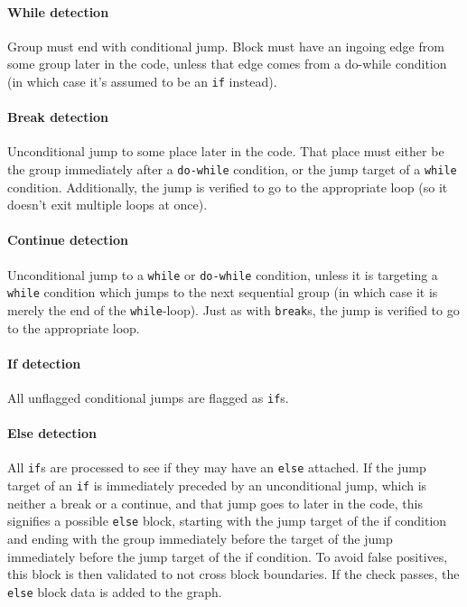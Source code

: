 \paragraph{While detection}
Group must end with conditional jump. Block must have an ingoing edge from some group later in the code, unless that edge comes from a do-while condition (in which case it's assumed to be an \verb+if+ instead).

\paragraph{Break detection}
Unconditional jump to some place later in the code. That place must either be the group immediately after a \verb+do-while+ condition, or the jump target of a \verb+while+ condition. Additionally, the jump is verified to go to the appropriate loop (so it doesn't exit multiple loops at once).

\paragraph{Continue detection}
Unconditional jump to a \verb+while+ or \verb+do-while+ condition, unless it is targeting a \verb+while+ condition which jumps to the next sequential group (in which case it is merely the end of the \verb+while+-loop). Just as with \verb+break+s, the jump is verified to go to the appropriate loop.

\paragraph{If detection}
All unflagged conditional jumps are flagged as \verb+if+s.

\paragraph{Else detection}
All \verb+if+s are processed to see if they may have an \verb+else+ attached. If the jump target of an \verb+if+ is immediately preceded by an unconditional jump, which is neither a break or a continue, and that jump goes to later in the code, this signifies a possible \verb+else+ block, starting with the jump target of the if condition and ending with the group immediately before the target of the jump immediately before the jump target of the if condition. To avoid false positives, this block is then validated to not cross block boundaries. If the check passes, the \verb+else+ block data is added to the graph.

